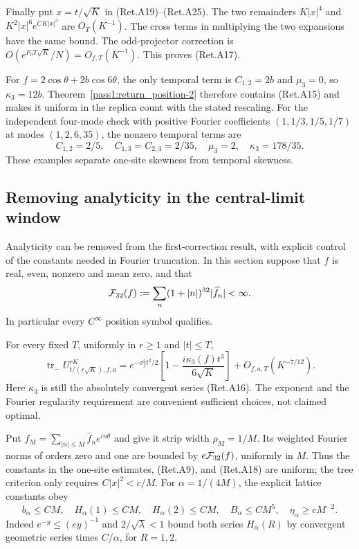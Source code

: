 Finally put \(x=t/\sqrt K\) in (Ret.A19)--(Ret.A25).
The two remainders \(K|x|^4\) and \(K^2|x|^6e^{CK|x|^3}\)
are \(O_T(K^{-1})\). The cross terms in multiplying the two expansions
have the same bound.
The odd-projector correction is
\(O(e^{F_0T\sqrt K}/N)=O_{f,T}(K^{-1})\).
This proves (Ret.A17).

For \(f=2\cos\theta+2b\cos6\theta\), the only temporal term is
\(C_{1,2}=2b\) and \(\mu_3=0\), so \(\kappa_3=12b\).
Theorem~\ref{pass1:return_position-2} therefore contains (Ret.A15) and makes it uniform in the
replica count with the stated rescaling.
For the independent four-mode check with positive Fourier
coefficients \((1,1/3,1/5,1/7)\) at modes \((1,2,6,35)\), the
nonzero temporal terms are
\[
 C_{1,2}=2/5,\quad C_{1,3}=C_{2,3}=2/35,\quad
                   \mu_3=2,\quad\kappa_3=178/35.
\]
These examples separate one-site skewness from temporal skewness.

\hypertarget{removing-analyticity-in-the-central-limit-window}{%
\subsection{Removing analyticity in the central-limit window}\label{removing-analyticity-in-the-central-limit-window}}

Analyticity can be removed from the first-correction result, with
explicit control of the constants needed in Fourier truncation.
In this section suppose that \(f\) is real, even, nonzero and mean zero,
and that
\[
 {\cal F}_{32}(f):=\sum_n(1+|n|)^{32}|\widehat f_n|<\infty.
\]
In particular every \(C^\infty\) position symbol qualifies.

\begin{theorem}\label{pass1:return_position-3} For every fixed \(T\), uniformly in \(r\ge1\) and
\(|t|\le T\),
\[
 \operatorname{tr}_-U_{t/(r\sqrt K),f,a}^{rK}
 =e^{-\sigma_f^2t^2/2}
       \left[1-\frac{i\kappa_3(f)t^3}{6\sqrt K}\right]
                   +O_{f,a,T}(K^{-7/12}).                  \tag{Ret.A27}
\]
Here \(\kappa_3\) is still the absolutely convergent series (Ret.A16).
The exponent and the Fourier regularity requirement are convenient
sufficient choices, not claimed optimal.
\end{theorem}

Put \(f_M=\sum_{|n|\le M}\widehat f_n e^{in\theta}\) and give it
strip width \(\rho_M=1/M\). Its weighted Fourier norms of orders zero
and one are bounded by \(e{\cal F}_{32}(f)\), uniformly in \(M\).
Thus the constants in the one-site estimates, (Ret.A9), and (Ret.A18)
are uniform; the tree criterion only requires \(C|x|^2<c/M\).
For \(\alpha=1/(4M)\), the explicit lattice constants obey
\[
 b_\alpha\le CM,\quad H_\alpha(1)\le CM,\quad
 H_\alpha(2)\le CM,\quad
 B_\alpha\le CM^5,\quad \eta_\alpha\ge cM^{-2}.              \tag{Ret.A28}
\]
Indeed \(e^{-y}\le (ey)^{-1}\) and \(2/\sqrt\lambda<1\) bound
both series \(H_\alpha(R)\) by convergent geometric series times
\(C/\alpha\), for \(R=1,2\).

